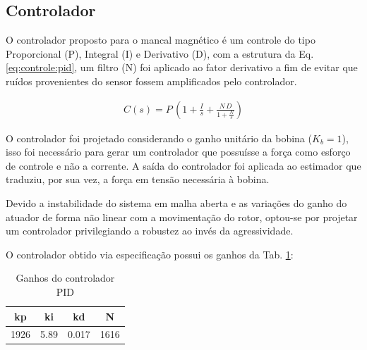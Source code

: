 \subsection{Controlador}

O controlador proposto para o mancal magnético é um controle do tipo Proporcional (P), Integral (I) e Derivativo (D), com a estrutura da Eq. \eqref{eq:controle:pid}, um filtro (N) foi aplicado ao fator derivativo a fim de evitar que ruídos provenientes do sensor fossem amplificados pelo controlador.

\begin{align}
	C(s) = P \, \left( 1 + \frac{I}{s} + \frac{N \, D}{ 1 + \frac{N}{s}} \right)
	\label{eq:controle:pid}
\end{align}

O controlador foi projetado considerando o ganho unitário da bobina ($K_b = 1$), isso foi necessário para gerar um controlador que possuísse a força como esforço de controle e não a corrente. A saída do controlador foi aplicada ao estimador que traduziu, por sua vez, a força em tensão necessária à bobina. 

Devido a instabilidade do sistema em malha aberta e as variações do ganho do atuador de forma não linear com a movimentação do rotor, optou-se por projetar um controlador privilegiando a robustez ao invés da agressividade.

O controlador obtido via especificação possui os ganhos da Tab. \ref{tab:controle:pid}:

\begin{table}[ht!]
\centering
	\begin{tabular}{c c c c}
	 kp  &  ki & kd &  N  \\
	 \hline \hline
		1926	 &	5.89	& 0.017	&1616
	\end{tabular} 
	\caption{Ganhos do controlador PID}
	\label{tab:controle:pid}
\end{table}


